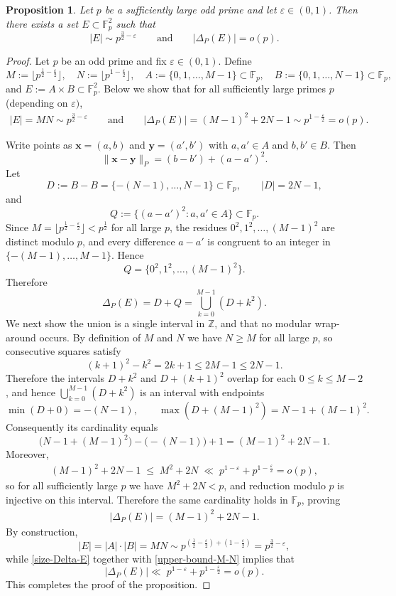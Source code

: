 \documentclass{article}
\newtheorem{proposition}[theorem]{Proposition}
\newcommand{\F}{\mathbb{F}}
\newcommand{\1}{\mathbf{1}}
\begin{document}
 \begin{proposition}\label{prop:prime-counterexample}
Let $p$ be a sufficiently large odd prime and let $\varepsilon \in (0,1)$.
Then there exists a set $E\subset \F_p^2$ such that
\[
|E| \sim p^{\frac{3}{2}-\varepsilon}
\qquad\text{and}\qquad
|\Delta_P(E)|=o(p).
\]
\end{proposition}

\begin{proof}
Let $p$ be an odd prime and fix $\varepsilon\in(0,1)$.
Define
\[
M:=\big\lfloor p^{\frac12-\frac{\varepsilon}{2}}\big\rfloor,
\quad
N:=\big\lfloor p^{1-\frac{\varepsilon}{2}}\big\rfloor,
\quad
A:=\{0,1,\dots,M-1\}\subset \F_p,
\quad
B:=\{0,1,\dots,N-1\}\subset \F_p,
\]
and $E:=A\times B\subset \F_p^2$. Below we show that for all sufficiently large primes $p$ (depending on $\varepsilon)$,
\begin{align*}
    |E| = MN \sim p^{\frac{3}{2}-\varepsilon}
\qquad\text{and}\qquad
|\Delta_P(E)| = (M-1)^2+2N-1 \sim p^{1-\frac{\varepsilon}{2}} = o(p).
\end{align*}

Write points as $\mathbf{x}=(a,b)$ and $\mathbf{y}=(a',b')$ with $a,a'\in A$ and $b,b'\in B$. Then
\[
\|\mathbf{x}-\mathbf{y}\|_P=(b-b')+(a-a')^2.
\]
Let
\[
D:=B-B=\{-(N-1),\dots,N-1\}\subset \F_p,
\qquad |D|=2N-1,
\]
and
\[
Q:=\{(a-a')^2:a,a'\in A\}\subset \F_p.
\]
Since $M=\big\lfloor p^{\frac12-\frac{\varepsilon}{2}}\big\rfloor<p^{\frac{1}{2}}$ for all large $p$, the residues
$0^2,1^2,\dots,(M-1)^2$ are distinct modulo $p$, and every difference $a-a'$ is congruent to an
integer in $\{-(M-1),\dots,M-1\}$. Hence
\[
Q=\{0^2,1^2,\dots,(M-1)^2\}.
\]
Therefore
\[
\Delta_P(E)=D+Q=\bigcup_{k=0}^{M-1}(D+k^2).
\]
We next show the union is a single interval in $\mathbb{Z}$, and that no modular wrap-around occurs.
By definition of $M$ and $N$ we have $N\ge M$ for all large $p$, so consecutive squares satisfy
\[
(k+1)^2-k^2=2k+1\le 2M-1\le 2N-1.
\]
Therefore the intervals $D+k^2$ and $D+(k+1)^2$ overlap for each
$0\le k\le M-2$, and hence
$\bigcup\limits_{k=0}^{M-1}(D+k^2)$
is an interval with endpoints
\[
\min(D+0)=-(N-1),
\qquad
\max(D+(M-1)^2)=N-1+(M-1)^2.
\]
Consequently its cardinality equals
\[
\bigl(N-1+(M-1)^2\bigr)-\bigl(-(N-1)\bigr)+1=(M-1)^2+2N-1.
\]
Moreover,
\begin{align}\label{upper-bound-M-N}
    (M-1)^2+2N-1 \;\le\; M^2+2N \;\ll\; p^{1-\varepsilon}+p^{1-\frac{\varepsilon}{2}}=o(p),
\end{align}
so for all sufficiently large $p$ we have $M^2+2N<p$, and reduction modulo $p$ is injective on this interval. Therefore the same cardinality holds in $\F_p$, proving
\begin{align}\label{size-Delta-E}
    |\Delta_P(E)|=(M-1)^2+2N-1.
\end{align}
By construction,
\[
|E|=|A|\cdot |B|=MN \sim p^{(\frac12-\frac{\varepsilon}{2})+(1-\frac{\varepsilon}{2})}
= p^{\frac{3}{2}-\varepsilon},
\]
while \eqref{size-Delta-E} together with \eqref{upper-bound-M-N} implies that
\[
|\Delta_P(E)| \ll\; p^{1-\varepsilon}+p^{1-\frac{\varepsilon}{2}}=o(p).
\]
This completes the proof of the proposition.
\end{proof}
\end{document}
